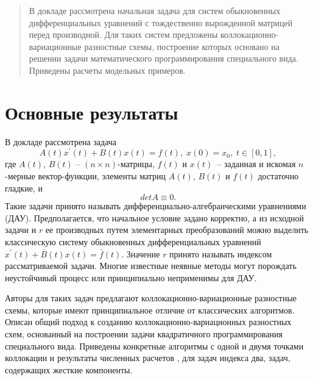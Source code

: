 


\maketitle

\begin{abstract}
В докладе рассмотрена начальная задача для систем обыкновенных дифференциальных уравнений с тождественно вырожденной матрицей перед производной. Для таких систем предложены коллокационно-вариационные разностные схемы, построение которых основано на решении задачи математического программирования специального вида. Приведены расчеты модельных примеров.

\end{abstract}

\section{Основные результаты} %


В докладе рассмотрена задача
$$
A(t) x^{'}(t) + B(t)x(t) = f(t), \; x(0) = x_{0}, \; t \in [0,1], 
$$
где $A(t)$, $B(t)$ -- $(n \times n)$-матрицы, $f(t)$ и $x(t)$~-- заданная и искомая $n$-мерные вектор-функции, элементы матриц $A(t)$, $B(t)$ и $f(t)$ достаточно гладкие, и
  $$detA\equiv0.$$ Такие задачи принято называть дифференциально-алгебраическими уравнениями (ДАУ). Предполагается, что начальное условие задано корректно, а из исходной задачи и $r$ ее производных путем элементарных преобразований можно выделить классическую систему обыкновенных дифференциальных уравнений $x^{'}(t)+\bar{B}(t)x(t)=\bar{f}(t)$. Значение $r$ принято называть индексом рассматриваемой задачи. Многие известные неявные методы могут порождать неустойчивый процесс или принципиально неприменимы для ДАУ.
	
	Авторы для таких задач предлагают коллокационно-вариационные разностные схемы, которые имеют принципиальное отличие от классических алгоритмов. Описан общий подход к созданию коллокационно-вариационных разностных схем, основанный на построении задачи квадратичного программирования специального вида. Приведены конкретные алгоритмы с одной и двумя точками коллокации и результаты численных расчетов \cite{BulSol1},\cite{BulSol2} для задач индекса два, задач, содержащих жесткие компоненты.


